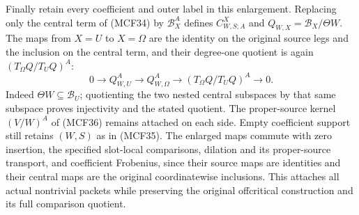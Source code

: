 Finally retain every coefficient and outer label in this enlargement.
Replacing only the central term of (MCF34) by $\mathscr B_X^A$
defines $C^X_{W,S;A}$ and $Q_{W,X}=\mathscr B_X/\Theta W$.
The maps from $X=U$ to $X=\Omega$ are the identity on the original
source legs and the inclusion on the central term, and their
degree-one quotient is again $(T_\Omega Q/T_UQ)^A$:
\[
0\longrightarrow Q_{W,U}^A\longrightarrow Q_{W,\Omega}^A
  \longrightarrow (T_\Omega Q/T_UQ)^A\longrightarrow0.
\tag{MCF41g}
\]
Indeed $\Theta W\subseteq\mathscr B_U$; quotienting the two nested
central subspaces by that same subspace proves injectivity and the
stated quotient.  The proper-source kernel $(V/W)^A$ of (MCF36)
remains attached on each side.  Empty coefficient support still
retains $(W,S)$ as in (MCF35).  The enlarged maps commute with zero
insertion, the specified slot-local comparisons, dilation and its
proper-source transport, and coefficient Frobenius, since their
source maps are identities and their central maps are the original
coordinatewise inclusions.  This attaches all actual nontrivial
packets while preserving the original offcritical construction and
its full comparison quotient.
